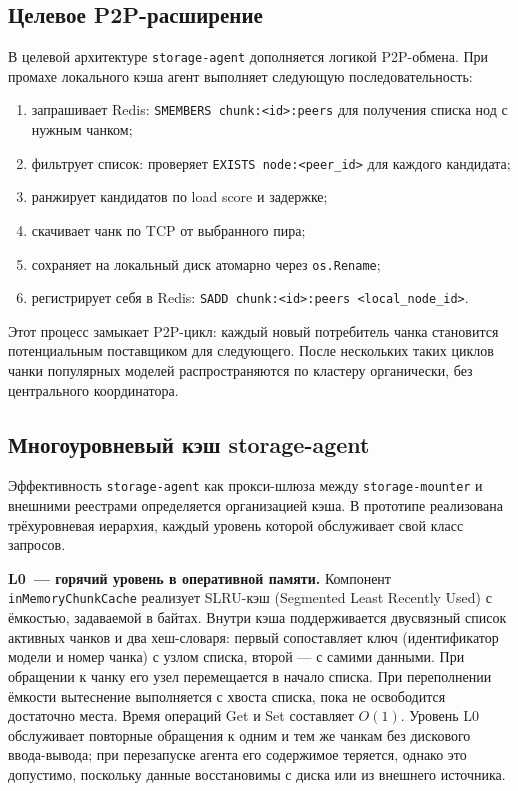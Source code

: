 \subsection*{Целевое P2P-расширение}

В целевой архитектуре \texttt{storage-agent} дополняется логикой P2P-обмена. При промахе локального кэша агент выполняет следующую последовательность:
\begin{enumerate}[leftmargin=*]
  \item запрашивает Redis: \texttt{SMEMBERS chunk:<id>:peers} для получения списка нод с нужным чанком;
  \item фильтрует список: проверяет \texttt{EXISTS node:<peer\_id>} для каждого кандидата;
  \item ранжирует кандидатов по load score и задержке;
  \item скачивает чанк по TCP от выбранного пира;
  \item сохраняет на локальный диск атомарно через \texttt{os.Rename};
  \item регистрирует себя в Redis: \texttt{SADD chunk:<id>:peers <local\_node\_id>}.
\end{enumerate}

Этот процесс замыкает P2P-цикл: каждый новый потребитель чанка становится потенциальным поставщиком для следующего. После нескольких таких циклов чанки популярных моделей распространяются по кластеру органически, без центрального координатора.

\subsection*{Многоуровневый кэш storage-agent}

Эффективность \texttt{storage-agent} как прокси-шлюза между \texttt{storage-mounter} и внешними реестрами определяется организацией кэша. В прототипе реализована трёхуровневая иерархия, каждый уровень которой обслуживает свой класс запросов.

\textbf{L0~--- горячий уровень в оперативной памяти.} Компонент \texttt{inMemoryChunkCache} реализует SLRU-кэш (Segmented Least Recently Used) с ёмкостью, задаваемой в байтах. Внутри кэша поддерживается двусвязный список активных чанков и два хеш-словаря: первый сопоставляет ключ (идентификатор модели и номер чанка) с узлом списка, второй — с самими данными. При обращении к чанку его узел перемещается в начало списка. При переполнении ёмкости вытеснение выполняется с хвоста списка, пока не освободится достаточно места. Время операций Get и Set составляет $O(1)$. Уровень L0 обслуживает повторные обращения к одним и тем же чанкам без дискового ввода-вывода; при перезапуске агента его содержимое теряется, однако это допустимо, поскольку данные восстановимы с диска или из внешнего источника.

